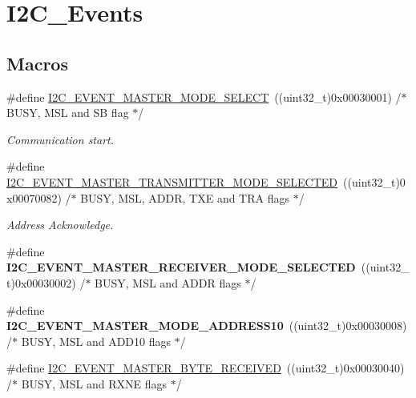 \hypertarget{group___i2_c___events}{}\section{I2\+C\+\_\+\+Events}
\label{group___i2_c___events}
\subsection*{Macros}
\begin{DoxyCompactItemize}
\item 
\#define \mbox{\hyperlink{group___i2_c___events_gaeef8c22ac035122b06e31b360ac7aeb3}{I2\+C\+\_\+\+E\+V\+E\+N\+T\+\_\+\+M\+A\+S\+T\+E\+R\+\_\+\+M\+O\+D\+E\+\_\+\+S\+E\+L\+E\+CT}}~((uint32\+\_\+t)0x00030001)  /$\ast$ B\+U\+S\+Y, M\+S\+L and S\+B flag $\ast$/
\begin{DoxyCompactList}\small\item\em Communication start. \end{DoxyCompactList}\item 
\#define \mbox{\hyperlink{group___i2_c___events_ga2361a6e60b7dc86fb682dd06fbd3edb7}{I2\+C\+\_\+\+E\+V\+E\+N\+T\+\_\+\+M\+A\+S\+T\+E\+R\+\_\+\+T\+R\+A\+N\+S\+M\+I\+T\+T\+E\+R\+\_\+\+M\+O\+D\+E\+\_\+\+S\+E\+L\+E\+C\+T\+ED}}~((uint32\+\_\+t)0x00070082)  /$\ast$ B\+U\+S\+Y, M\+S\+L, A\+D\+D\+R, T\+X\+E and T\+R\+A flags $\ast$/
\begin{DoxyCompactList}\small\item\em Address Acknowledge. \end{DoxyCompactList}\item 
\mbox{\label{group___i2_c___events_gabfde82864432ddb87b6462234d542e60}} 
\#define {\bfseries I2\+C\+\_\+\+E\+V\+E\+N\+T\+\_\+\+M\+A\+S\+T\+E\+R\+\_\+\+R\+E\+C\+E\+I\+V\+E\+R\+\_\+\+M\+O\+D\+E\+\_\+\+S\+E\+L\+E\+C\+T\+ED}~((uint32\+\_\+t)0x00030002)  /$\ast$ B\+U\+S\+Y, M\+S\+L and A\+D\+D\+R flags $\ast$/
\item 
\mbox{\label{group___i2_c___events_gad04882597bbf542c6fee7a9c837fbc8c}} 
\#define {\bfseries I2\+C\+\_\+\+E\+V\+E\+N\+T\+\_\+\+M\+A\+S\+T\+E\+R\+\_\+\+M\+O\+D\+E\+\_\+\+A\+D\+D\+R\+E\+S\+S10}~((uint32\+\_\+t)0x00030008)  /$\ast$ B\+U\+S\+Y, M\+S\+L and A\+D\+D10 flags $\ast$/
\item 
\#define \mbox{\hyperlink{group___i2_c___events_ga6bcf2ae49961e07e27cf9fdf334719e3}{I2\+C\+\_\+\+E\+V\+E\+N\+T\+\_\+\+M\+A\+S\+T\+E\+R\+\_\+\+B\+Y\+T\+E\+\_\+\+R\+E\+C\+E\+I\+V\+ED}}~((uint32\+\_\+t)0x00030040)  /$\ast$ B\+U\+S\+Y, M\+S\+L and R\+X\+N\+E flags $\ast$/

\end{DoxyCompactItemize}

